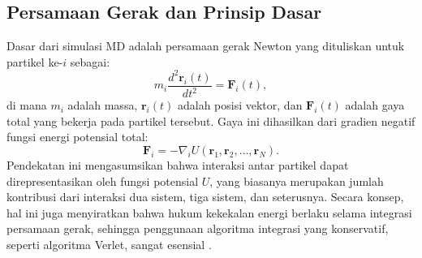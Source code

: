 \subsection{Persamaan Gerak dan Prinsip Dasar}
Dasar dari simulasi MD adalah persamaan gerak Newton yang dituliskan untuk partikel ke-\(i\) sebagai:
\begin{equation}
    m_i \frac{d^2 \mathbf{r}_i(t)}{dt^2} = \mathbf{F}_i(t),
\end{equation}
di mana \(m_i\) adalah massa, \(\mathbf{r}_i(t)\) adalah posisi vektor, dan \(\mathbf{F}_i(t)\) adalah gaya total yang bekerja pada partikel tersebut.
Gaya ini dihasilkan dari gradien negatif fungsi energi potensial total:
\begin{equation}
    \mathbf{F}_i = -\nabla_i U(\mathbf{r}_1, \mathbf{r}_2, \ldots, \mathbf{r}_N).
\end{equation}
Pendekatan ini mengasumsikan bahwa interaksi antar partikel dapat direpresentasikan oleh fungsi potensial \( U \), yang biasanya merupakan jumlah kontribusi dari interaksi dua sistem, tiga sistem, dan seterusnya.
Secara konsep, hal ini juga menyiratkan bahwa hukum kekekalan energi berlaku selama integrasi persamaan gerak, sehingga penggunaan algoritma integrasi yang konservatif, seperti algoritma Verlet, sangat esensial \citep{Allen1989}.

